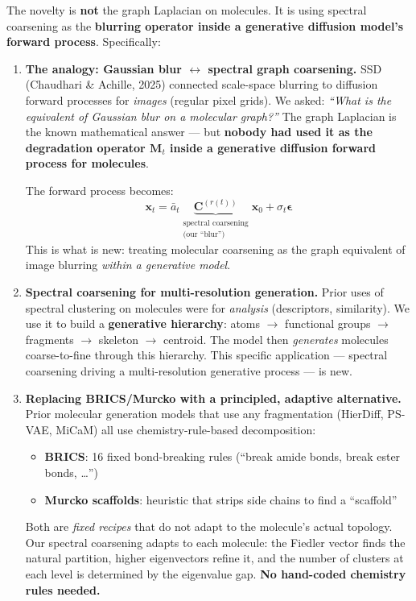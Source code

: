 \documentclass[12pt,a4paper]{article}
\begin{document}
\begin{tcolorbox}[
  colback=novelty!5, colframe=novelty!80!black,
  fonttitle=\bfseries\large, title={What IS new (MolSSD's actual contribution)},
  top=3mm, bottom=3mm
]
The novelty is \textbf{not} the graph Laplacian on molecules. It is using spectral coarsening as the \textbf{blurring operator inside a generative diffusion model's forward process}. Specifically:

\begin{enumerate}[leftmargin=*, itemsep=4pt]
  \item \textbf{The analogy: Gaussian blur $\leftrightarrow$ spectral graph coarsening.} SSD (Chaudhari \& Achille, 2025) connected scale-space blurring to diffusion forward processes for \emph{images} (regular pixel grids). We asked: \emph{``What is the equivalent of Gaussian blur on a molecular graph?''} The graph Laplacian is the known mathematical answer --- but \textbf{nobody had used it as the degradation operator $\bm{M}_t$ inside a generative diffusion forward process for molecules}.

  The forward process becomes:
  \[
  \bm{x}_t = \bar{a}_t \underbrace{\bm{C}^{(r(t))}}_{\substack{\text{spectral coarsening} \\ \text{(our ``blur'')}}} \bm{x}_0 + \sigma_t \bm{\epsilon}
  \]
  This is what is new: treating molecular coarsening as the graph equivalent of image blurring \emph{within a generative model}.

  \item \textbf{Spectral coarsening for multi-resolution generation.} Prior uses of spectral clustering on molecules were for \emph{analysis} (descriptors, similarity). We use it to build a \textbf{generative hierarchy}: atoms $\to$ functional groups $\to$ fragments $\to$ skeleton $\to$ centroid. The model then \emph{generates} molecules coarse-to-fine through this hierarchy. This specific application --- spectral coarsening driving a multi-resolution generative process --- is new.

  \item \textbf{Replacing BRICS/Murcko with a principled, adaptive alternative.} Prior molecular generation models that use any fragmentation (HierDiff, PS-VAE, MiCaM) all use chemistry-rule-based decomposition:
  \begin{itemize}
    \item \textbf{BRICS}: 16 fixed bond-breaking rules (``break amide bonds, break ester bonds, \ldots'')
    \item \textbf{Murcko scaffolds}: heuristic that strips side chains to find a ``scaffold''
  \end{itemize}
  Both are \emph{fixed recipes} that do not adapt to the molecule's actual topology. Our spectral coarsening adapts to each molecule: the Fiedler vector finds the natural partition, higher eigenvectors refine it, and the number of clusters at each level is determined by the eigenvalue gap. \textbf{No hand-coded chemistry rules needed.}
\end{enumerate}


\end{tcolorbox}
\end{document}
